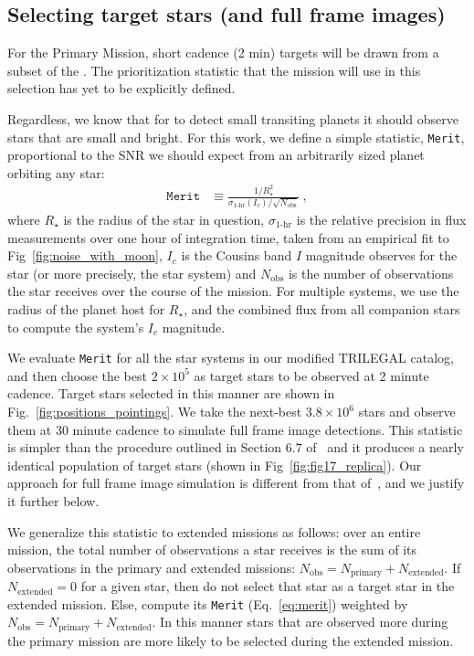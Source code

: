 \subsection{Selecting target stars (and full frame images)}
\label{sec:selection_criteria}
For the Primary Mission, \tesss short cadence (2 min) targets will be drawn from a subset of the \tic. 
The prioritization statistic that the mission will use in this selection has yet to be explicitly defined.

Regardless, we know that for \tess to detect small transiting planets
it should observe stars that are small and bright.  For this work, we
define a simple statistic, \texttt{Merit}, proportional to the SNR we
should expect from an arbitrarily sized planet orbiting any star:
\begin{align}
\texttt{Merit} &\equiv 
	\frac{1/R_\star^2}{\sigma_\text{1-hr}(I_c)/\sqrt{N_\text{obs}}}\ ,
\label{eq:merit}
\end{align}
where $R_\star$ is the radius of the star in question,
$\sigma_\text{1-hr}$ is the relative precision in flux measurements
over one hour of integration time, taken from an empirical fit to
Fig~\ref{fig:noise_with_moon}, $I_c$ is the Cousins band $I$ magnitude
\tess observes for the star (or more precisely, the star system) and
$N_\text{obs}$ is the number of observations the star receives over
the course of the mission.  For multiple systems, we use the radius of
the planet host for $R_\star$, and the combined flux from all
companion stars to compute the system's $I_c$ magnitude.

We evaluate \texttt{Merit} for all the star systems in our modified
TRILEGAL catalog, and then choose the best $2\times10^5$ as target
stars to be observed at 2 minute cadence.  Target stars selected in
this manner are shown in Fig.~\ref{fig:positions_pointings}.  We take
the next-best $3.8\times10^6$ stars and observe them at 30 minute
cadence to simulate full frame image detections.  This statistic is
simpler than the procedure outlined in Section 6.7
of~ and it produces a nearly identical
population of target stars (shown in Fig~\ref{fig:fig17_replica}).
Our approach for full frame image simulation is different from that
of~, and we justify it further below.

We generalize this statistic to extended missions as follows: over an
entire mission, the total number of observations a star receives is
the sum of its observations in the primary and extended missions:
$N_\text{obs}=N_\text{primary}+N_\text{extended}$.  If
$N_\text{extended}=0$ for a given star, then do not select that star as a
target star in the extended mission.  Else, compute its \texttt{Merit}
(Eq.~\ref{eq:merit}) weighted by
$N_\text{obs}=N_\text{primary}+N_\text{extended}$.  In this manner
stars that are observed more during the primary mission are more
likely to be selected during the extended mission.
 
